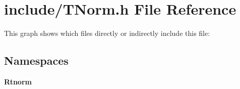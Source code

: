\section{include/\+T\+Norm.h File Reference}
\label{_t_norm_8h}
This graph shows which files directly or indirectly include this file\+:
\subsection*{Namespaces}
\begin{DoxyCompactItemize}
\item 
 \textbf{ Rtnorm}
\end{DoxyCompactItemize}
